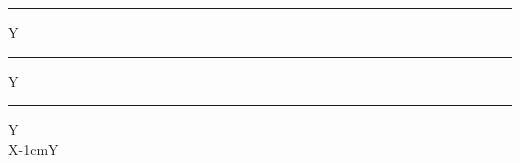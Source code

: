 \documentclass{minimal}
\begin{document}
	\noindent
\kern500000sp\rule{500000sp}{500000sp}Y
\kern500000sp\rule[-250000sp]{500000sp}{500000sp}Y
\kern500000sp\rule[250000sp]{500000sp}{500000sp}Y
\\
X\kern-1cmY
\end{document}
